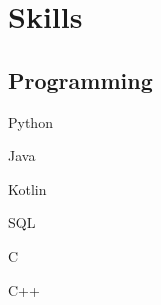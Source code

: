 \documentclass[]{abhijeet_viswa-deedy-resume-openfont}
\begin{document}
\begin{minipage}[t]{0.25\textwidth}
%


\section{Skills}
\subsection{Programming}
\begin{itemize*}
 \item Python
 \item Java
 \item Kotlin
\end{itemize*}
\subsectionsep

\begin{itemize*}
 \item SQL
 \item C
 \item C++
\end{itemize*}
\subsectionsep


\end{minipage}
\end{document}
